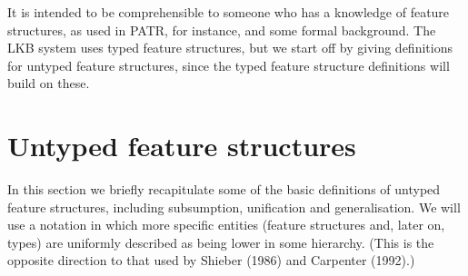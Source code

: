 \documentclass[12pt]{report}
\begin{document}
It is intended to be comprehensible
to someone who has a knowledge
of feature structures, as used in PATR, for instance, and some
formal background.  The LKB system
uses typed feature structures, but we start off by giving definitions
for untyped feature structures, since the typed feature structure
definitions will build on these.

\section{Untyped feature structures}
\label{extvsint}

In this section we briefly recapitulate 
some of the basic definitions of untyped feature structures, including
subsumption, unification and generalisation.  
We will use a notation in which more specific entities
(feature structures and, later on, types) are uniformly described as
being lower in some hierarchy.  (This is the opposite direction
to that used by Shieber (1986) and Carpenter (1992).)
\end{document}
